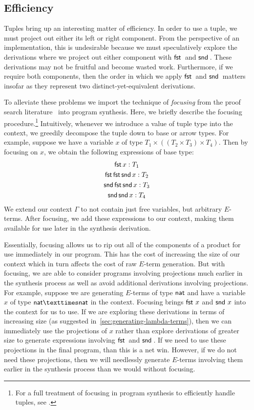 \subsection{Efficiency}
\label{subsec:tuple-efficiency}

Tuples bring up an interesting matter of efficiency.
In order to use a tuple, we must project out either its left or right component.
From the perspective of an implementation, this is undesirable because we must speculatively explore the derivations where we project out either component with $\mfst$ and $\msnd$.
These derivations may not be fruitful and become wasted work.
Furthermore, if we require both components, then the order in which we apply $\mfst$ and $\msnd$ matters insofar as they represent two distinct-yet-equivalent derivations.

To alleviate these problems we import the technique of \emph{focusing} from the proof search literature~\citep{liang-csl-2007} into program synthesis.
Here, we briefly describe the focusing procedure.\footnote{%
  For a full treatment of focusing in program synthesis to efficiently handle tuples, see \citet{frankle-mastersthesis-2015}.
}
Intuitively, whenever we introduce a value of tuple type into the context, we greedily decompose the tuple down to base or arrow types.
For example, suppose we have a variable $x$ of type $T_1 × ((T_2 × T_3) × T_4)$.
Then by focusing on $x$, we obtain the following expressions of base type:
\begin{gather*}
  \mathsf{fst}\,x : T_1 \\
  \mathsf{fst}\,\mathsf{fst}\,\mathsf{snd}\,x : T_2 \\
  \mathsf{snd}\,\mathsf{fst}\,\mathsf{snd}\,x : T_3 \\
  \mathsf{snd}\,\mathsf{snd}\,x : T_4
\end{gather*}
We extend our context $Γ$ to not contain just free variables, but arbitrary $E$-terms.
After focusing, we add these expressions to our context, making them available for use later in the synthesis derivation.

Essentially, focusing allows us to rip out all of the components of a product for use immediately in our program.
This has the cost of increasing the size of our context which in turn affects the cost of raw $E$-term generation.
But with focusing, we are able to consider programs involving projections much earlier in the synthesis process as well as avoid additional derivations involving projections.
For example, suppose we are generating $E$-terms of type $\mathsf{nat}$ and have a variable $x$ of type $\mnat × \mnat$ in the context.
Focusing brings $\mathsf{fst}\,\,x$ and $\mathsf{snd}\,\,x$ into the context for us to use.
If we are exploring these derivations in terms of increasing size (as suggested in~\autoref{sec:generating-lambda-terms}), then we can immediately use the projections of $x$ rather than explore derivations of greater size to generate expressions involving $\mfst$ and $\msnd$.
If we need to use these projections in the final program, than this is a net win.
However, if we do not need these projections, then we will needlessly generate $E$-terms involving them earlier in the synthesis process than we would without focusing.

